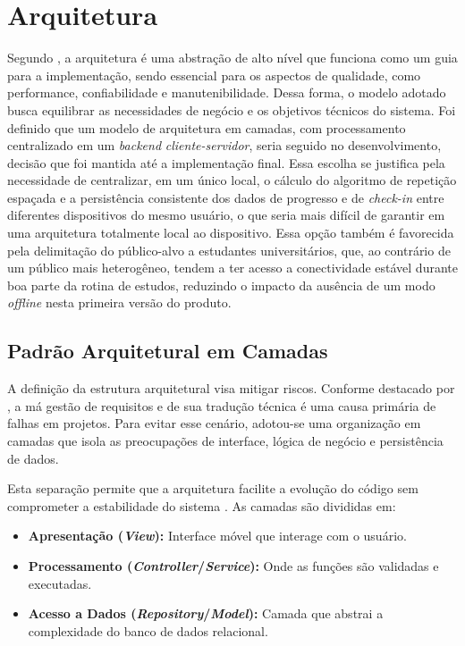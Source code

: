 \section{Arquitetura}

Segundo , a arquitetura é uma abstração de alto nível que funciona como um guia para a implementação, sendo essencial para os aspectos de qualidade, como performance, confiabilidade e manutenibilidade.
Dessa forma, o modelo adotado busca equilibrar as necessidades de negócio e os objetivos técnicos do sistema.
Foi definido que um modelo de arquitetura em camadas, com processamento centralizado em um \textit{backend} \textit{cliente-servidor}, seria seguido no desenvolvimento, decisão que foi mantida até a implementação final.
Essa escolha se justifica pela necessidade de centralizar, em um único local, o cálculo do algoritmo de repetição espaçada e a persistência consistente dos dados de progresso e de \textit{check-in} entre diferentes dispositivos do mesmo usuário, o que seria mais difícil de garantir em uma arquitetura totalmente local ao dispositivo.
Essa opção também é favorecida pela delimitação do público-alvo a estudantes universitários, que, ao contrário de um público mais heterogêneo, tendem a ter acesso a conectividade estável durante boa parte da rotina de estudos, reduzindo o impacto da ausência de um modo \textit{offline} nesta primeira versão do produto.

\subsection{Padrão Arquitetural em Camadas}

A definição da estrutura arquitetural visa mitigar riscos.
Conforme destacado por , a má gestão de requisitos e de sua tradução técnica é uma causa primária de falhas em projetos.
Para evitar esse cenário, adotou-se uma organização em camadas que isola as preocupações de interface, lógica de negócio e persistência de dados.

Esta separação permite que a arquitetura facilite a evolução do código sem comprometer a estabilidade do sistema \cite{dipompeo_2025}.
As camadas são divididas em:

\begin{itemize}
    \item \textbf{Apresentação (\textit{View}):} Interface móvel que interage com o usuário.
    \item \textbf{Processamento (\textit{Controller}/\textit{Service}):} Onde as funções são validadas e executadas.
    \item \textbf{Acesso a Dados (\textit{Repository}/\textit{Model}):} Camada que abstrai a complexidade do banco de dados relacional.
\end{itemize}

